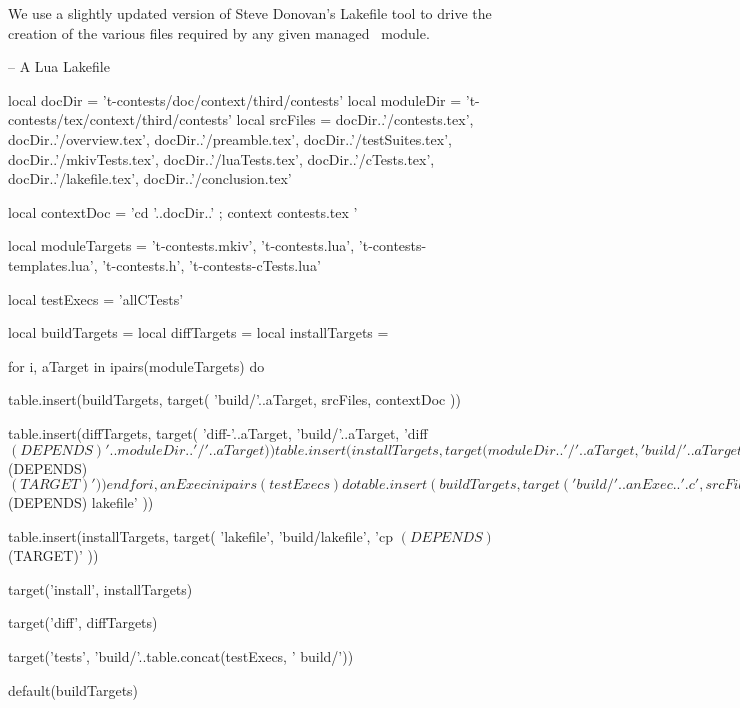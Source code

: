 
\startchapter[title=Lakefile]

We use a slightly updated version of Steve Donovan's Lakefile tool to 
drive the creation of the various files required by any given 
 managed \ConTeXt\ module. 

\startLakefile
-- A Lua Lakefile

local docDir    = 't-contests/doc/context/third/contests'
local moduleDir = 't-contests/tex/context/third/contests'
local srcFiles = {
  docDir..'/contests.tex',
  docDir..'/overview.tex',
  docDir..'/preamble.tex',
  docDir..'/testSuites.tex',
  docDir..'/mkivTests.tex',
  docDir..'/luaTests.tex',
  docDir..'/cTests.tex',
  docDir..'/lakefile.tex',
  docDir..'/conclusion.tex'
}

local contextDoc = 
  'cd '..docDir..' ; context contests.tex '

local moduleTargets = {
  't-contests.mkiv',
  't-contests.lua',
  't-contests-templates.lua',
  't-contests.h',
  't-contests-cTests.lua'
}

local testExecs = {
  'allCTests'
}

local buildTargets   = { }
local diffTargets    = { }
local installTargets = { }

for i, aTarget in ipairs(moduleTargets) do

  table.insert(buildTargets, target(
    'build/'..aTarget,
    srcFiles,
    contextDoc
  ))

  table.insert(diffTargets, target(
    'diff-'..aTarget,
    'build/'..aTarget,
    'diff $(DEPENDS) '..moduleDir..'/'..aTarget
  ))

  table.insert(installTargets, target(
    moduleDir..'/'..aTarget,
    'build/'..aTarget,
    'cp $(DEPENDS) $(TARGET)'
  ))
end

for i, anExec in ipairs(testExecs) do

  table.insert(buildTargets, target(
    'build/'..anExec..'.c',
    srcFiles,
    contextDoc
  ))

  c.program{
    'build/'..anExec,
    src=anExec..'.c',
    cdir='build',
    needs='lua5.2'
  }
end

table.insert(buildTargets, target(
  'build/lakefile',
  srcFiles,
  contextDoc
))

table.insert(diffTargets, target(
  'diff-lakefile',
  'build/lakefile',
  'diff $(DEPENDS) lakefile'
))

table.insert(installTargets, target(
  'lakefile',
  'build/lakefile',
  'cp $(DEPENDS) $(TARGET)'
))

target('install', installTargets)

target('diff', diffTargets)

target('tests', 'build/'..table.concat(testExecs, ' build/'))

default(buildTargets)
\stopLakefile

\stopchapter